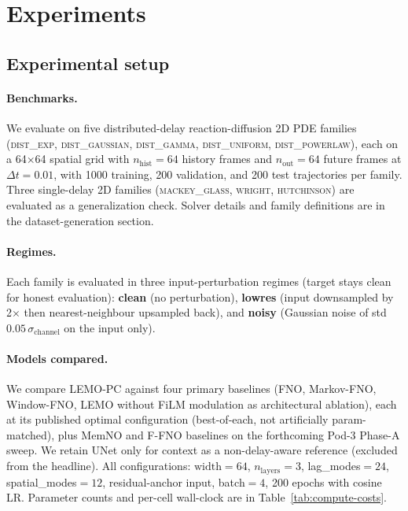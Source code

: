 %

\section{Experiments}
\label{sec:experiments}

\subsection{Experimental setup}
\label{sec:exp-setup}

\paragraph{Benchmarks.}
We evaluate on five distributed-delay reaction-diffusion 2D PDE families
(\textsc{dist\_exp}, \textsc{dist\_gaussian}, \textsc{dist\_gamma},
\textsc{dist\_uniform}, \textsc{dist\_powerlaw}), each on a 64$\times$64
spatial grid with $n_{\text{hist}} = 64$ history frames and
$n_{\text{out}} = 64$ future frames at $\Delta t = 0.01$, with 1000
training, 200 validation, and 200 test trajectories per family.  Three
single-delay 2D families (\textsc{mackey\_glass}, \textsc{wright},
\textsc{hutchinson}) are evaluated as a generalization check.  Solver
details and family definitions are in the dataset-generation section.

\paragraph{Regimes.}
Each family is evaluated in three input-perturbation regimes (target
stays clean for honest evaluation): \textbf{clean} (no perturbation),
\textbf{lowres} (input downsampled by 2$\times$ then nearest-neighbour
upsampled back), and \textbf{noisy} (Gaussian noise of std
$0.05\,\sigma_{\text{channel}}$ on the input only).

\paragraph{Models compared.}
We compare LEMO-PC against four primary baselines (FNO, Markov-FNO,
Window-FNO, LEMO without FiLM modulation as architectural ablation),
each at its published optimal configuration (best-of-each, not
artificially param-matched), plus MemNO and F-FNO baselines on the
forthcoming Pod-3 Phase-A sweep.  We retain UNet only for context as a
non-delay-aware reference (excluded from the headline).  All
configurations: $\text{width}=64$, $n_{\text{layers}}=3$,
lag\_modes$=24$, spatial\_modes$=12$, residual-anchor input,
batch$=4$, 200 epochs with cosine LR.  Parameter counts and per-cell
wall-clock are in Table~\ref{tab:compute-costs}.

